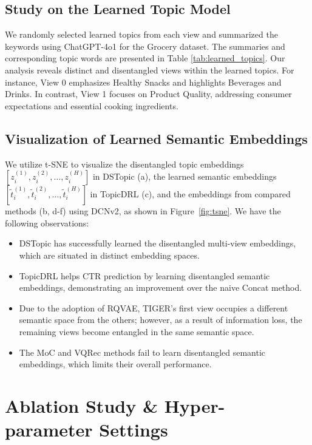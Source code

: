 \subsection{Study on the Learned Topic Model}
We randomly selected learned topics from each view and summarized the keywords using ChatGPT-4o1 for the Grocery dataset. The summaries and corresponding topic words are presented in Table \ref{tab:learned_topics}. Our analysis reveals distinct and disentangled views within the learned topics. For instance, View 0 emphasizes Healthy Snacks and highlights Beverages and Drinks. In contrast, View 1 focuses on Product Quality, addressing consumer expectations and essential cooking ingredients.

\subsection{Visualization of Learned Semantic Embeddings}
We utilize t-SNE \cite{van2008visualizing} to visualize the disentangled topic embeddings $[z^{(1)}_i, z^{(2)}_i, \dots, z^{(H)}_i]$ in DSTopic (a), the learned semantic embeddings $[\tilde{t}^{(1)}_i, \tilde{t}^{(2)}_i, \dots, \tilde{t}^{(H)}_i]$ in TopicDRL (c), and the embeddings from compared methods (b, d-f) using DCNv2, as shown in Figure~\ref{fig:tsne}. We have the following observations:
\begin{itemize}
    \item DSTopic has successfully learned the disentangled multi-view embeddings, which are situated in distinct embedding spaces.
    \item TopicDRL helps CTR prediction by learning disentangled semantic embeddings, demonstrating an improvement over the naive Concat method.
    \item Due to the adoption of RQVAE, TIGER’s first view occupies a different semantic space from the others; however, as a result of information loss\cite{zhang2024towards}, the remaining views become entangled in the same semantic space.
    \item The MoC and VQRec methods fail to learn disentangled semantic embeddings, which limits their overall performance.
\end{itemize}

\section{Ablation Study \& Hyper-parameter Settings}
